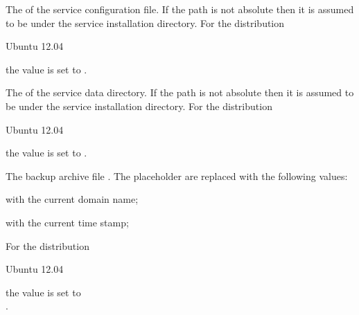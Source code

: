 
The  of the service configuration file. If the path is
not absolute then it is assumed to be under the service installation
directory.
For the distribution
\begin{inparaitem}
\item[\TheDistribution{ubuntu}] Ubuntu 12.04
\end{inparaitem}
the value is set to .


The  of the service data directory. If the path is
not absolute then it is assumed to be under the service installation
directory.
For the distribution
\begin{inparaitem}
\item[\TheDistribution{ubuntu}] Ubuntu 12.04
\end{inparaitem}
the value is set to .


The backup archive file .
The placeholder are replaced with the following values:

\begin{compactitem}
\item {} with the current domain name;
\item {} with the current time stamp;
\end{compactitem}

For the distribution
\begin{inparaitem}
\item[\TheDistribution{ubuntu}] Ubuntu 12.04
\end{inparaitem}
the value is set to\\ .

